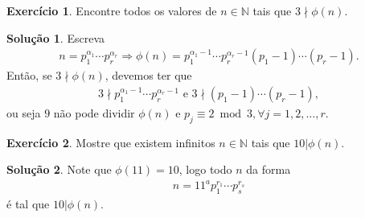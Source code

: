 \documentclass[a4paper,11pt,twoside, leqno]{article}
\theoremstyle{definition}
\newtheorem{exercise}{Exercício}
\newtheorem*{solution}{Solução}
\begin{document}
\begin{exercise}
	Encontre todos os valores de $n\in\mathbb{N}$ tais que $3\nmid\phi(n)$.
\end{exercise}
\begin{solution}
	Escreva 
	\begin{align*}
	n = p_1^{\alpha_1}\cdots p_r^{\alpha_r}\Longrightarrow \phi(n) = p_1^{\alpha_1 - 1}\cdots p_r^{\alpha_r - 1}(p_1 - 1)\cdots (p_r - 1).
	\end{align*}
	Então, se $3\nmid \phi(n)$, devemos ter que
	\begin{align*}
	3\nmid p_1^{\alpha_1 - 1}\cdots p_r^{\alpha_r - 1} \text{ e } 3\nmid (p_1 - 1)\cdots (p_r - 1),
	\end{align*}
	ou seja $9$ não pode dividir $\phi(n)$ e $p_j\equiv 2\bmod 3,\forall j=1,2,\dots,r$.
\end{solution}

\begin{exercise}
	Mostre que existem infinitos $n\in\mathbb{N}$ tais que $10|\phi(n)$.
\end{exercise}
\begin{solution}
	Note que $\phi(11) = 10$, logo todo $n$ da forma
	\begin{align*}
	n = 11^ap_1^{r_1}\cdots p_s^{r_s}
	\end{align*}
	é tal que $10|\phi(n)$.
\end{solution}
\end{document}
